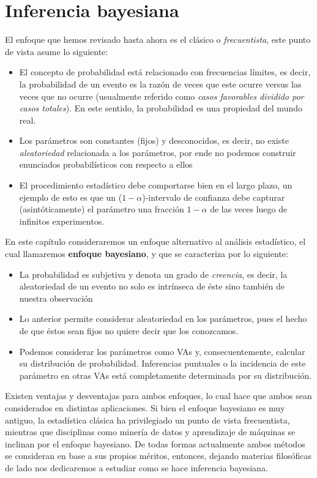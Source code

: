 

\chapter{Inferencia bayesiana}


El enfoque que hemos revisado hasta ahora  es el clásico o \emph{frecuentista}, este punto de vista asume lo siguiente: 
\begin{itemize}
	\item El concepto de probabilidad está relacionado con frecuencias límites, es decir, la probabilidad de un evento es la razón de veces que este ocurre versus las veces que no ocurre (usualmente referido como \emph{casos favorables dividido por casos totales}). En este sentido, la probabilidad es una propiedad del mundo real. 
	\item Los parámetros son constantes (fijos) y desconocidos, es decir, no existe \emph{aleatoriedad} relacionada a los parámetros, por ende no podemos construir enunciados probabilísticos con respecto a ellos
	\item El procedimiento estadístico debe comportarse bien en el largo plazo, un ejemplo de esto es que un ($1-\alpha$)-intervalo de confianza debe capturar (asintóticamente) el parámetro una fracción $1-\alpha$ de las veces luego de infinitos experimentos. 
\end{itemize}

En este capítulo consideraremos un enfoque alternativo al análisis estadístico, el cual llamaremos \textbf{enfoque bayesiano}, y que se caracteriza por lo siguiente: 

\begin{itemize}
 	\item La probabilidad es subjetiva y denota un grado de \emph{creencia}, es decir, la aleatoriedad de un evento no solo es intrínseca de éste sino también de nuestra observación
 	\item Lo anterior permite considerar aleatoriedad en los parámetros, pues el hecho de que éstos sean fijos no quiere decir que los conozcamos. 
 	\item Podemos considerar los parámetros como VAs y, consecuentemente, calcular su distribución de probabilidad. Inferencias puntuales o la incidencia de este parámetro en otras VAs está completamente determinada por su distribución.
 \end{itemize}

 Existen ventajas y desventajas para ambos enfoques, lo cual hace que ambos sean considerados en distintas aplicaciones. Si bien el enfoque bayesiano es muy antiguo, la estadística clásica ha privilegiado un punto de vista frecuentista, mientras que disciplinas como minería de datos y aprendizaje de máquinas se inclinan por el enfoque bayesiano. De todas formas actualmente ambos métodos se consideran en base a sus propios méritos, entonces, dejando materias filosóficas de lado nos dedicaremos a estudiar como se hace inferencia bayesiana. 

